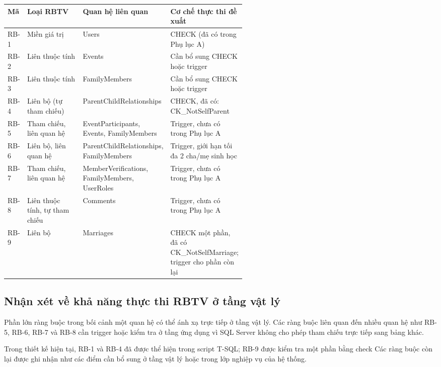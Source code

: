 \begin{center}
\small
\begin{tabularx}{\linewidth}{@{}l>{\raggedright\arraybackslash}p{0.24\linewidth}>{\raggedright\arraybackslash}p{0.31\linewidth}X@{}}
\toprule
\textbf{Mã} & \textbf{Loại RBTV} & \textbf{Quan hệ liên quan} & \textbf{Cơ chế thực thi đề xuất} \\
\midrule
RB-1 & Miền giá trị & Users & CHECK (đã có trong Phụ lục A) \\
RB-2 & Liên thuộc tính & Events & Cần bổ sung CHECK hoặc trigger \\
RB-3 & Liên thuộc tính & FamilyMembers & Cần bổ sung CHECK hoặc trigger \\
RB-4 & Liên bộ (tự tham chiếu) & ParentChildRelationships & CHECK, đã có: CK\_NotSelfParent \\
RB-5 & Tham chiếu, liên quan hệ & EventParticipants, Events, FamilyMembers & Trigger, chưa có trong Phụ lục A \\
RB-6 & Liên bộ, liên quan hệ & ParentChildRelationships, FamilyMembers & Trigger, giới hạn tối đa 2 cha/mẹ sinh học \\
RB-7 & Tham chiếu, liên quan hệ & MemberVerifications, FamilyMembers, UserRoles & Trigger, chưa có trong Phụ lục A \\
RB-8 & Liên thuộc tính, tự tham chiếu & Comments & Trigger, chưa có trong Phụ lục A \\
RB-9 & Liên bộ & Marriages & CHECK một phần, đã có CK\_NotSelfMarriage; trigger cho phần còn lại \\
\bottomrule
\end{tabularx}
\end{center}

\subsection*{Nhận xét về khả năng thực thi RBTV ở tầng vật lý}

Phần lớn ràng buộc trong bối cảnh một quan hệ có thể ánh xạ trực tiếp ở tầng vật lý. Các ràng buộc liên quan đến nhiều quan hệ như RB-5, RB-6, RB-7 và RB-8 cần trigger hoặc kiểm tra ở tầng ứng dụng vì SQL Server không cho phép tham chiếu trực tiếp sang bảng khác.

Trong thiết kế hiện tại, RB-1 và RB-4 đã được thể hiện trong script T-SQL; RB-9 được kiểm tra một phần bằng check Các ràng buộc còn lại được ghi nhận như các điểm cần bổ sung ở tầng vật lý hoặc trong lớp nghiệp vụ của hệ thống.

